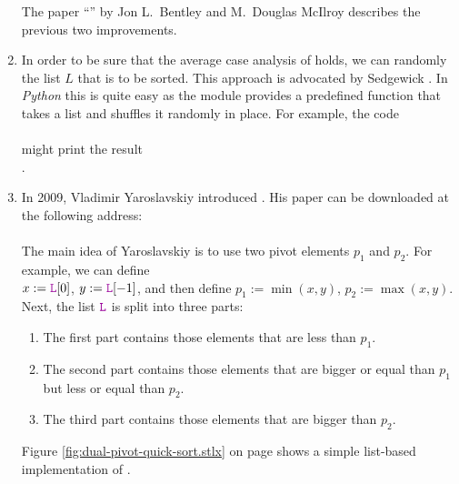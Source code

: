 \begin{enumerate}
      The paper ``'' by Jon L.~Bentley and M.~Douglas McIlroy
      \cite{bentley:93} describes the previous two improvements.
\item In order to be sure that the average case analysis of  holds, we can randomly
       the list $L$ that is to be sorted.  This approach is advocated by Sedgewick
      \cite{sedgewick:2011}.  In \textsl{Python} this is quite easy as
      the module  provides a predefined function  that takes a list and shuffles
      it randomly in place.  For example, the code
      \\[0.2cm]
      \hspace*{1.3cm}
      \\[0.2cm]
      might print the result
      \\[0.2cm]
      \hspace*{1.3cm}
      \mytt{[1, 9, 8, 5, 2, 0, 6, 3, 4, 7]}.
\item In 2009, Vladimir Yaroslavskiy introduced 
      \cite{yaroslavskiy:2009}.
      His paper can be
      downloaded at the following address:
      \\[0.2cm]
      \hspace*{0.8cm}
      \href{http://codeblab.com/wp-content/uploads/2009/09/DualPivotQuicksort.pdf}{}
      \\[0.2cm]
      The main idea of Yaroslavskiy is to use two pivot elements $p_1$ and $p_2$.  For example, we can
      define
      \\[0.2cm]
      \hspace*{1.3cm}
      $x := \mytt{L}[0]$, $y := \mytt{L}[-1]$, \quad and then define \quad $p_1 :=\min(x, y)$, $p_2 := \max(x, y)$.
      \\[0.2cm]
      Next, the list $\mytt{L}$ is split into three parts:
      \begin{enumerate}
      \item The first part contains those elements that are less than $p_1$.
      \item The second part contains those elements that are bigger or equal than $p_1$ but less or
            equal than $p_2$.
      \item The third part contains those elements that are bigger than $p_2$.
      \end{enumerate}
      Figure \ref{fig:dual-pivot-quick-sort.stlx} on page \pageref{fig:dual-pivot-quick-sort.stlx}
      shows a simple list-based implementation of .


\end{enumerate}
